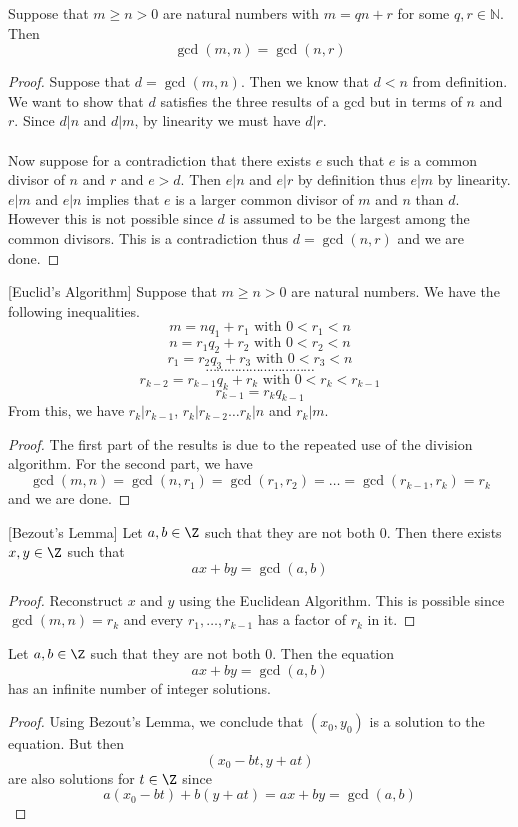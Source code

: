 \begin{prp}{}{} Suppose that $m\geq n>0$ are natural numbers with $m=qn+r$ for some $q,r\in\mathbb{N}$. Then $$\gcd{(m,n)}=\gcd{(n,r)}$$
\end{prp}
\begin{proof}
Suppose that $d=\gcd(m,n)$. Then we know that $d<n$ from definition. We want to show that $d$ satisfies the three results of a gcd but in terms of $n$ and $r$. Since $d|n$ and $d|m$, by linearity we must have $d|r$. \\~\\
Now suppose for a contradiction that there exists $e$ such that $e$ is a common divisor of $n$ and $r$ and $e>d$. Then $e|n$ and $e|r$ by definition thus $e|m$ by linearity. $e|m$ and $e|n$ implies that $e$ is a larger common divisor of $m$ and $n$ than $d$. However this is not possible since $d$ is assumed to be the largest among the common divisors. This is a contradiction thus $d=\gcd(n,r)$ and we are done. 
\end{proof}

\begin{thm}{}{}[Euclid's Algorithm] Suppose that $m\geq n>0$ are natural numbers. We have the following inequalities. 
$$m=nq_1+r_1\text{ with }0<r_1<n$$
$$n=r_1q_2+r_2\text{ with }0<r_2<n$$
$$r_1=r_2q_3+r_3\text{ with }0<r_3<n$$
$$\cdots\cdots\cdots\cdots\cdots\cdots\cdots\cdots\cdots\cdots$$
$$r_{k-2}=r_{k-1}q_k+r_k\text{ with }0<r_k<r_{k-1}$$
$$r_{k-1}=r_kq_{k-1}$$
From this, we have $r_k|r_{k-1}$, $r_k|r_{k-2}\dots r_k|n$ and $r_k|m$. 
\end{thm}
\begin{proof} The first part of the results is due to the repeated use of the division algorithm. For the second part, we have $$\gcd(m,n)=\gcd(n,r_1)=\gcd(r_1,r_2)=\dots=\gcd(r_{k-1},r_k)=r_k$$ and we are done. 
\end{proof}

\begin{lmm}{}{}[Bezout's Lemma] Let $a,b\in\Z$ such that they are not both $0$. Then there exists $x,y\in\Z$ such that $$ax+by=\gcd(a,b)$$
\end{lmm}
\begin{proof} Reconstruct $x$ and $y$ using the Euclidean Algorithm. This is possible since $\gcd(m,n)=r_k$ and every $r_1,\dots,r_{k-1}$ has a factor of $r_k$ in it. 
\end{proof}

\begin{lmm}{}{} Let $a,b\in\Z$ such that they are not both $0$. Then the equation $$ax+by=\gcd(a,b)$$ has an infinite number of integer solutions. 
\end{lmm}
\begin{proof} Using Bezout's Lemma, we conclude that $(x_0,y_0)$ is a solution to the equation. But then $$(x_0-bt,y+at)$$ are also solutions for $t\in\Z$ since $$a(x_0-bt)+b(y+at)=ax+by=\gcd(a,b)$$
\end{proof}

